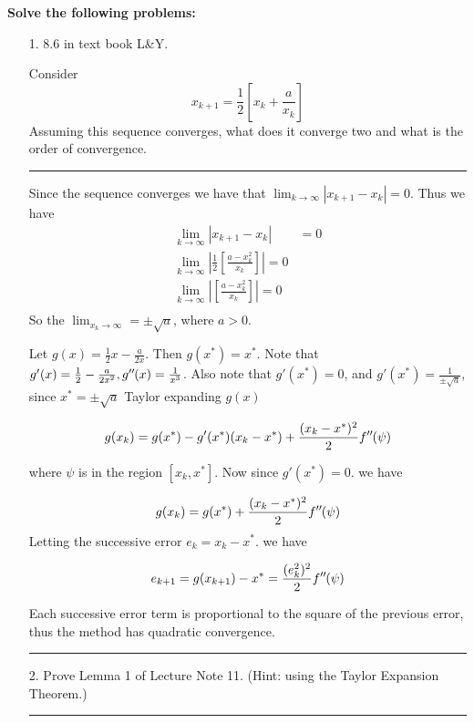 \documentclass{article} %
\newcommand*{\dprime}{^{\prime\prime}\mkern-1.2mu}
\begin{document}
{\textbf{Solve the following problems:}}
\begin{enumerate}
\item[1.] 8.6 in text book L\&Y.



Consider 
\[
x_{k+1}= \frac{1}{2}[ x_k + \frac{a}{x_k}]
\]
Assuming this sequence converges, what does it converge two and what is the order of convergence. 

\rule{\textwidth}{1pt}

Since the sequence converges we have that $\lim_{k \to \infty} |x_{k+1} - x_{k}| = 0$. Thus we have
\begin{equation*}
\begin{aligned}
\lim_{k \to \infty} |x_{k+1} - x_{k} | &= 0 \\ 
\lim_{k \to \infty}| \frac{1}{2}[ \frac{ a  - x_k^2}{x_k}] | = 0 \\ 
\lim_{k \to \infty}| [ \frac{ a -  x_k^2}{x_k}] | = 0 \\ 
\end{aligned}
\end{equation*}
So the $\lim_{x_k \to \infty} = \pm \sqrt{a}$, where $a > 0$. 

Let $g(x) = \frac{1}{2} x - \frac{a}{2x}$. Then $g(x^{*}) = x^{*}$.  Note
that $g'(x) = \frac{1}{2} - \frac{a}{2x^2}, g\dprime(x) = \frac{1}{x^3}$. Also note that
$g'(x^{*}) = 0$, and $g\prime(x^{*}) = \frac{1}{\pm \sqrt{a}}$, since $x^* = \pm \sqrt{a}$
Taylor expanding $g(x)$

\[
g(x_k) = g(x^{*}) - g'(x^{*})(x_k - x^{*}) + \frac{(x_k - x^*)^2}{2} f\dprime (\psi)
\]

where $\psi$ is in the region $[x_k, x^{*}]$. Now since $g'(x^{*}) = 0$. we have 

\[
g(x_k) = g(x^{*}) +  \frac{(x_k - x^*)^2}{2} f\dprime (\psi)
\]
Letting the successive error $e_k = x_k - x^{*}$. we have

\[
e_{k+1} = g(x_{k+1}) - x^{*} =  \frac{(e_k^2)^2}{2} f\dprime (\psi)
\]



Each successive error term is proportional to the square of the previous error, thus the method has quadratic convergence.

\rule{\textwidth}{1pt}


\item[2.] Prove Lemma 1 of Lecture Note 11. (Hint: using the Taylor Expansion Theorem.)

\rule{\textwidth}{1pt}


\end{enumerate}
\end{document}
